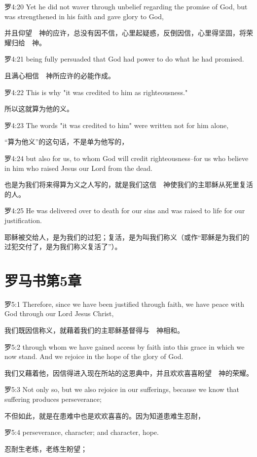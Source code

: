 \documentclass[a4paper,11pt,onecolumn,twoside]{ctexart}
\begin{document}
\begin{multicols}{2}
 罗4:20
 Yet he did not waver through unbelief regarding the promise of God, but was strengthened in his faith and gave glory to God,

 并且仰望　神的应许，总没有因不信，心里起疑惑，反倒因信，心里得坚固，将荣耀归给　神。


 罗4:21
 being fully persuaded that God had power to do what he had promised.

 且满心相信　神所应许的必能作成。


 罗4:22
 This is why "it was credited to him as righteousness."

 所以这就算为他的义。


 罗4:23
 The words "it was credited to him" were written not for him alone,

 “算为他义”的这句话，不是单为他写的，


 罗4:24
 but also for us, to whom God will credit righteousness--for us who believe in him who raised Jesus our Lord from the dead.

 也是为我们将来得算为义之人写的，就是我们这信　神使我们的主耶稣从死里复活的人。


 罗4:25
 He was delivered over to death for our sins and was raised to life for our justification.

 耶稣被交给人，是为我们的过犯；复活，是为叫我们称义（或作“耶稣是为我们的过犯交付了，是为我们称义复活了”）。


 \section{罗马书第5章}
 罗5:1
 Therefore, since we have been justified through faith, we have peace with God through our Lord Jesus Christ,

 我们既因信称义，就藉着我们的主耶稣基督得与　神相和。


 罗5:2
 through whom we have gained access by faith into this grace in which we now stand. And we rejoice in the hope of the glory of God.

 我们又藉着他，因信得进入现在所站的这恩典中，并且欢欢喜喜盼望　神的荣耀。


 罗5:3
 Not only so, but we also rejoice in our sufferings, because we know that suffering produces perseverance;

 不但如此，就是在患难中也是欢欢喜喜的。因为知道患难生忍耐，


 罗5:4
 perseverance, character; and character, hope.

 忍耐生老练，老练生盼望；



\end{multicols}
\end{document}
